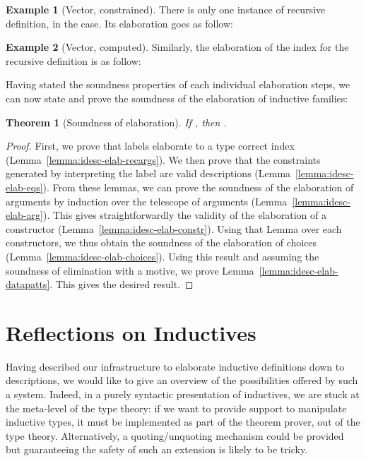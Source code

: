 \documentclass{scrartcl}
\theoremstyle{plain}
\newtheorem{theorem}{Theorem}
\theoremstyle{definition}
\newtheorem{example}{Example}
\begin{document}
\begin{example}[Vector, constrained]

There is only one instance of recursive definition, in the 
case. Its elaboration goes as follow:


\end{example}



\begin{example}[Vector, computed]

Similarly, the elaboration of the index for the recursive definition
is as follow:


\end{example}




Having stated the soundness properties of each individual elaboration
steps, we can now state and prove the soundness of the elaboration of
inductive families:
\begin{theorem}[Soundness of elaboration]

If 
, then
.

\end{theorem}
\begin{proof}

First, we prove that labels elaborate to a type correct index
(Lemma~\ref{lemma:idesc-elab-recargs}). We then prove that the
constraints generated by interpreting the label are valid descriptions
(Lemma~\ref{lemma:idesc-elab-eqs}). From these lemmas, we can prove
the soundness of the elaboration of arguments by induction over the
telescope of arguments (Lemma~\ref{lemma:idesc-elab-arg}). This gives
straightforwardly the validity of the elaboration of a constructor
(Lemma~\ref{lemma:idesc-elab-constr}). Using that Lemma over each
constructors, we thus obtain the soundness of the elaboration of
choices (Lemma~\ref{lemma:idesc-elab-choices}). Using this result and
assuming the soundness of elimination with a motive, we prove
Lemma~\ref{lemma:idesc-elab-datapatts}. This gives the desired result.

\end{proof}



\section{Reflections on Inductives}
\label{sec:discussion}




Having described our infrastructure to elaborate inductive definitions
down to descriptions, we would like to give an overview of the
possibilities offered by such a system. Indeed, in a purely syntactic
presentation of inductives, we are stuck at the meta-level of the type
theory: if we want to provide support to manipulate inductive types,
it must be implemented as part of the theorem prover, out of the type
theory. Alternatively, a quoting/unquoting mechanism could be provided
but guaranteeing the safety of such an extension is likely to be
tricky.
\end{document}
